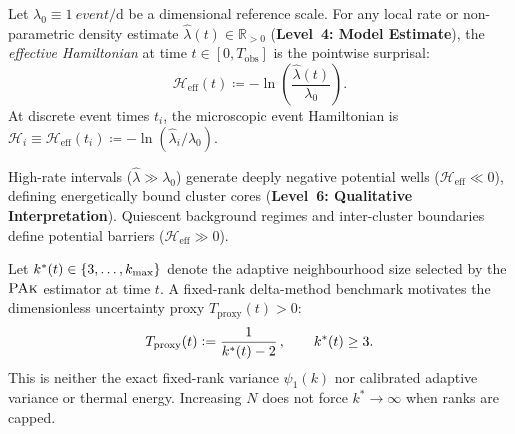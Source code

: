 \begin{definition}
  \label{def:effective_hamiltonian}
  Let $\lambda_0 \equiv \qty{1}{event\per\day}$ be a dimensional
  reference scale. For any local rate or non-parametric density
  estimate $\hat{\lambda}(t) \in \mathbb{R}_{>0}$ (\textbf{Level~4:
  Model Estimate}), the \emph{effective Hamiltonian} at time $t \in
  [0, T_{\mathrm{obs}}]$ is the pointwise surprisal:
  \begin{equation}
    \mathcal{H}_{\mathrm{eff}}(t) \coloneqq
    -\ln\!\left(\frac{\hat{\lambda}(t)}{\lambda_0}\right).
    \label{eq:effective_hamiltonian}
  \end{equation}
  At discrete event times $t_i$, the microscopic event Hamiltonian
  is $\mathcal{H}_i \equiv \mathcal{H}_{\mathrm{eff}}(t_i) \coloneqq
  -\ln(\hat{\lambda}_i/\lambda_0)$.
\end{definition}

High-rate intervals ($\hat{\lambda} \gg \lambda_0$) generate deeply
negative potential wells ($\mathcal{H}_{\mathrm{eff}} \ll 0$),
defining energetically bound cluster cores (\textbf{Level~6:
Qualitative Interpretation}). Quiescent background regimes and
inter-cluster boundaries define potential barriers
($\mathcal{H}_{\mathrm{eff}} \gg 0$).

\begin{definition}
  \label{prop:effective_temperature}
  Let $k^{*}(t) \in \{3, \dots, k_{\max}\}$ denote the adaptive
  neighbourhood size selected by the $\textsc{PAk}$ estimator at time $t$.
  A fixed-rank delta-method benchmark motivates the dimensionless
  uncertainty proxy $T_{\mathrm{proxy}}(t)>0$:
  \begin{equation}
    T_{\mathrm{proxy}}(t) \mathrel{\mathop:}=
    \frac{1}{k^{*}(t) - 2}\,, \qquad k^{*}(t) \ge \num{3}.
    \label{eq:effective_temperature}
  \end{equation}
  This is neither the exact fixed-rank variance $\psi_1(k)$ nor
  calibrated adaptive variance or thermal energy. Increasing $N$
  does not force $k^*\to\infty$ when ranks are capped.
\end{definition}

